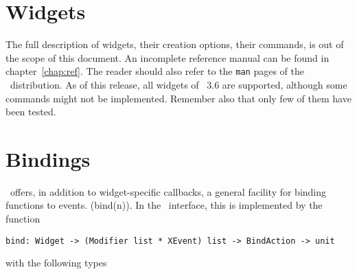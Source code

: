 \section{Widgets}
The full description of widgets, their creation options, their commands, is
out of the scope of this document. An incomplete reference manual can be
found in chapter~\ref{chap:ref}.
The reader should also refer to the \verb|man| pages of the \tk\
distribution. 
As of this release, all widgets of \tk\ 3.6 are supported, although some
commands might not be implemented. Remember also that only few of them have
been tested.

\section{Bindings}
\tk\ offers, in addition to widget-specific callbacks, a general facility
for binding functions to events. (bind(n)).
In the \caml\tk\ interface, this is implemented by the function
\begin{verbatim}
bind: Widget -> (Modifier list * XEvent) list -> BindAction -> unit
\end{verbatim} 
with the following types
